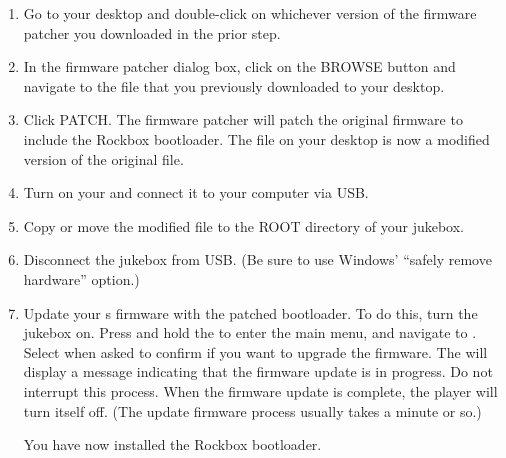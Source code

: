 \begin{enumerate}
{    built without Unicode support.}
  \item Go to your desktop and double-click on whichever version of the firmware 
  patcher you downloaded in the prior step.
  \item In the firmware patcher dialog box, click on the BROWSE button and navigate
  to the  file that you previously downloaded to your desktop.
  \item Click PATCH. The firmware patcher will patch the original firmware to 
  include the Rockbox bootloader. The  file on your desktop is now
  a modified version of the original  file.
  \item Turn on your \playerman{} and connect it to your computer via USB.
  \item Copy or move the modified  file to the ROOT directory of 
    your jukebox.
  \item Disconnect the jukebox from USB. (Be sure to use Windows' ``safely remove
  hardware'' option.)
  \item Update your \playerman{} s firmware with the patched bootloader. To do this, turn 
    the jukebox on. Press and hold the 
    to enter the main menu, and navigate to . Select  when asked to confirm if you want to upgrade the 
    firmware. The \playerman{} will display a message indicating that the
    firmware update 
    is in progress. Do not interrupt this process. When the firmware update is 
    complete, the player will turn itself off. (The update firmware process usually 
    takes a minute or so.)

    You have now installed the Rockbox bootloader. 


\end{enumerate}

